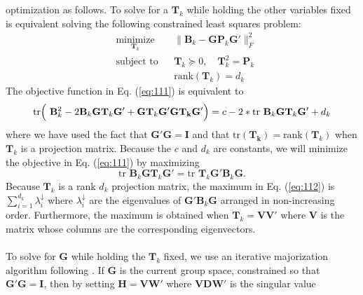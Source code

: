 optimization as follows. To solve for a $\mathbf{T}_k$ while holding
the other variables fixed is equivalent solving the following constrained least
squares problem:
\begin{equation}
  \label{eq:111}
  \begin{aligned}
	& \underset{\mathbf{T}_k}{\text{minimize}}
	& &  \| \mathbf{B}_k - \mathbf{G}
\mathbf{P}_k \mathbf{G}' \|_F^2 \\
	& \text{subject to}
	& & \mathbf{T}_k \succeq 0, \quad \mathbf{T}_k^2 = \mathbf{P}_k \\
    & & & \mathrm{rank}(\mathbf{T}_k) = d_k
  \end{aligned}
\end{equation}
The objective function in Eq. (\ref{eq:111}) is equivalent to 
\begin{equation*}
  \mathrm{tr}\Bigl(\,\, \mathbf{B}_k^2 - 2
  \mathbf{B}_k \mathbf{G} \mathbf{T}_{k} \mathbf{G}'
  + \mathbf{G} \mathbf{T}_k \mathbf{G}' \mathbf{G} \mathbf{T_k}
  \mathbf{G}'\Bigr) = c - 2 * \mathrm{tr} \,\, \mathbf{B}_k
  \mathbf{G} \mathbf{T}_{k} \mathbf{G}' + d_k
\end{equation*}
where we have used the fact that $\mathbf{G}' \mathbf{G} = \mathbf{I}$
and that $\mathrm{tr}(\mathbf{T_k}) =
\mathrm{rank}(\mathbf{T}_k)$ when $\mathbf{T}_k$ is a projection
matrix. Because the $c$ and $d_k$ are constants, we will minimize the
objective in Eq. (\ref{eq:111}) by maximizing
\begin{equation}
  \label{eq:112}
  \mathrm{tr} \,\, \mathbf{B}_k \mathbf{G}
  \mathbf{T}_{k} \mathbf{G}' = \mathrm{tr} \,\, \mathbf{T}_k \mathbf{G}'
  \mathbf{B}_k \mathbf{G}.
\end{equation}
Because $\mathbf{T}_k$ is a rank $d_k$ projection matrix, the maximum in
Eq. (\ref{eq:112}) is $\sum_{i=1}^{d_k} \lambda_{i}^{\downarrow}$ where
$\lambda_{i}^{\downarrow}$ are the eigenvalues of $\mathbf{G}'
\mathbf{B}_k \mathbf{G}$ arranged in
non-increasing order. Furthermore, the maximum is
obtained when $\mathbf{T}_k = \mathbf{V}
\mathbf{V}'$ where $\mathbf{V}$ is the matrix whose columns are the
corresponding eigenvectors. \\ \\
%
\noindent
To solve for $\mathbf{G}$ while holding the $\mathbf{T}_k$ fixed, we
use an iterative majorization algorithm following
\citet{kiers90:_major}. If $\mathbf{G}$ is the
current group space, constrained so that $\mathbf{G}' \mathbf{G} =
\mathbf{I}$, then by setting $\mathbf{H} = \mathbf{V} \mathbf{W}'$
where $\mathbf{V} \mathbf{D} \mathbf{W}'$ is the singular value
